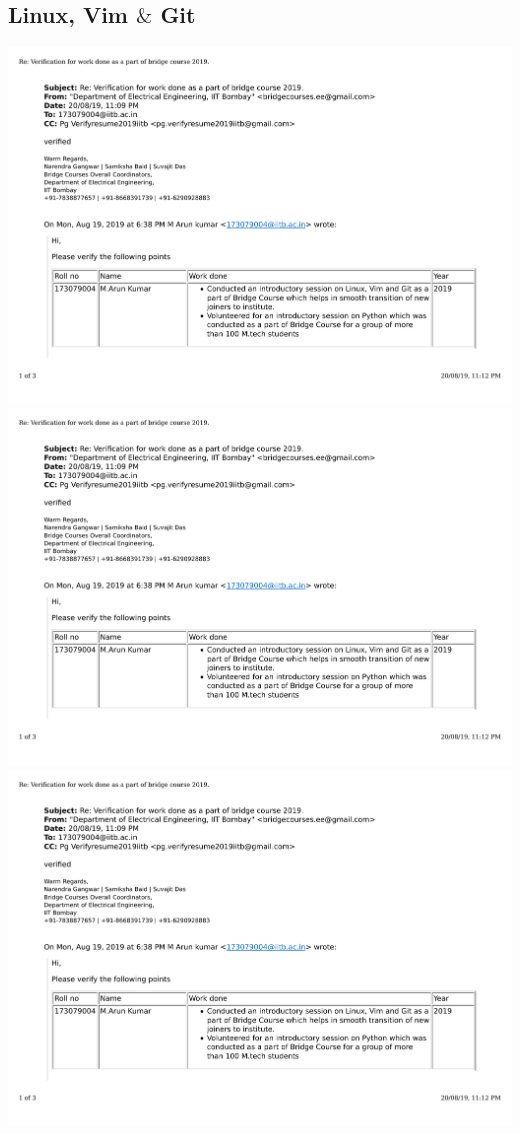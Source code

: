 \documentclass{article}
\begin{document}
	\subsection{Linux, Vim $\&$ Git}
		\includegraphics[page=1, scale=0.5]{proofs/bridge_courses.pdf}\\
		\includegraphics[page=2, scale=0.5]{proofs/bridge_courses.pdf}\\
		\includegraphics[page=3, scale=0.5]{proofs/bridge_courses.pdf}\\
\end{document}
